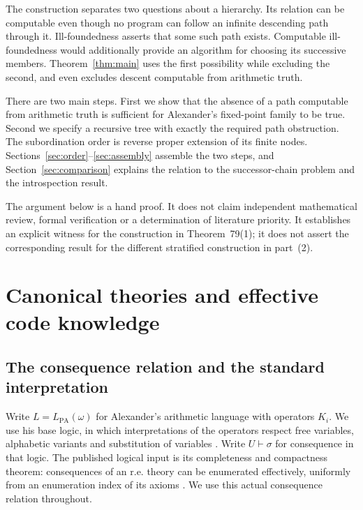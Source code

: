 \documentclass[11pt]{article}
\theoremstyle{definition}
\begin{document}
The construction separates two questions about a hierarchy. Its relation can
be computable even though no program can follow an infinite descending path
through it. Ill-foundedness asserts that some such path exists. Computable
ill-foundedness would additionally provide an algorithm for choosing its
successive members. Theorem~\ref{thm:main} uses the first possibility while
excluding the second, and even excludes descent computable from arithmetic
truth.

There are two main steps. First we show that the absence of a path computable
from arithmetic truth is sufficient for Alexander's fixed-point family to be
true. Second we specify a recursive tree with exactly the required path
obstruction. The subordination order is reverse proper extension of its
finite nodes. Sections~\ref{sec:order}--\ref{sec:assembly} assemble the two
steps, and Section~\ref{sec:comparison} explains the relation to the
successor-chain problem and the introspection result.

The argument below is a hand proof. It does not claim independent
mathematical review, formal verification or a determination of literature
priority. It establishes an explicit witness for the construction in
Theorem~79(1); it does not assert the corresponding result for the different
stratified construction in part~(2).

\section{Canonical theories and effective code knowledge}\label{sec:framework}

\subsection{The consequence relation and the standard interpretation}

Write $L=L_{\mathrm{PA}}(\omega)$ for Alexander's arithmetic language with operators
$K_i$. We use his base logic, in which interpretations of the operators
respect free variables, alphabetic variants and substitution of variables
\cite[Definition~2]{alexander}. Write $U\vdash\sigma$ for consequence in
that logic. The published logical input is its completeness and compactness
theorem: consequences of an r.e. theory can be enumerated effectively,
uniformly from an enumeration index of its axioms
\cite[Theorem~3]{alexander}. We use this actual consequence relation
throughout.
\end{document}
